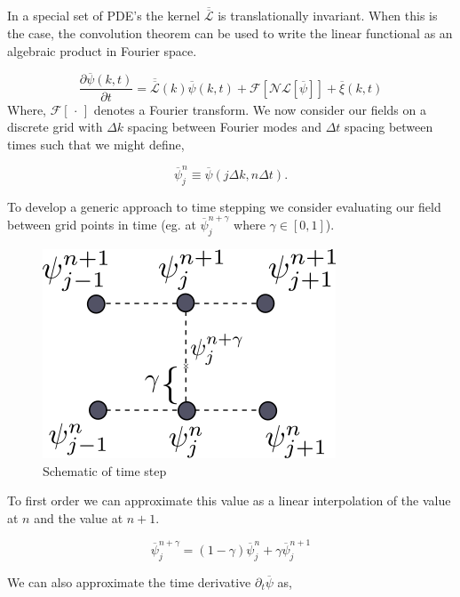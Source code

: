 \documentclass[11pt]{article}
\newcommand{\f}{\frac}
\newcommand*{\tn}[1]{\overline{\overline{#1}}}
\renewcommand*{\vec}[1]{\overline{#1}}
\begin{document}
In a special set of PDE's the kernel $\tn{\mathcal{L}}$ is translationally invariant. When this is the case, the convolution theorem can be used to write the linear functional as an algebraic product in Fourier space. 

\begin{equation}
	\f{\partial \vec{\psi}(k, t)}{\partial t} = \tn{\mathcal{L}}(k)\vec{\psi}(k, t) + \mathcal{F}\left[\mathcal{NL}\left[\vec{\psi}\right]\right] + \vec{\xi}(k, t)
\end{equation}
Where, $\mathcal{F}[\,\cdot\,]$ denotes a Fourier transform. We now consider our fields on a discrete grid with $\Delta k$ spacing between Fourier modes and $\Delta t$ spacing between times such that we might define, 

\begin{equation}
	\vec{\psi}_j^n \equiv \vec{\psi}(j\Delta k, n\Delta t). 
\end{equation}

To develop a generic approach to time stepping we consider evaluating our field between grid points in time (eg. at $\vec{\psi}_j^{n + \gamma}$ where $\gamma \in [0, 1]$). 

\begin{figure}[H]
	\label{schem}
	\begin{center}
	\includegraphics[scale=0.5]{algo_diagram.png}
	\end{center}
	\caption{Schematic of time step}
\end{figure}

To first order we can approximate this value as a linear interpolation of the value at $n$ and the value at $n + 1$. 

\begin{equation}
	\vec{\psi}_j^{n + \gamma} = (1 - \gamma) \vec{\psi}_j^n + \gamma \vec{\psi}_j^{n + 1}
\end{equation}

We can also approximate the time derivative $\partial_t \vec{\psi}$ as, 
\end{document}
